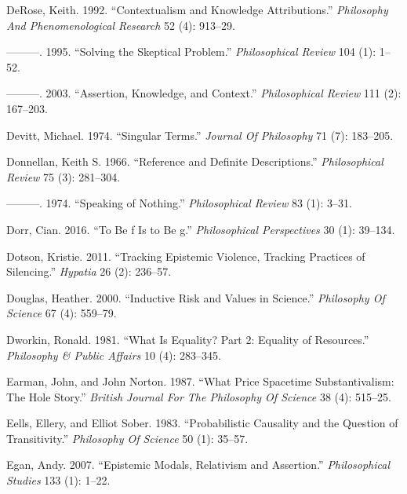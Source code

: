 \documentclass[
  10pt,
  letterpaper,
  DIV=11,
  numbers=noendperiod,
  twoside]{scrartcl}
\newlength{\cslhangindent}
\newenvironment{CSLReferences}[2] %
 {\begin{list}{}{%
  \setlength{\itemindent}{0pt}
  \setlength{\leftmargin}{0pt}
  \setlength{\parsep}{0pt}
  \ifodd #1
   \setlength{\leftmargin}{\cslhangindent}
   \setlength{\itemindent}{-1\cslhangindent}
  \fi
  \setlength{\itemsep}{#2\baselineskip}}}
 {\end{list}}
\begin{document}
\begin{CSLReferences}{1}{0}
DeRose, Keith. 1992. {``Contextualism and Knowledge Attributions.''}
\emph{Philosophy And Phenomenological Research} 52 (4): 913--29.

---------. 1995. {``Solving the Skeptical Problem.''}
\emph{Philosophical Review} 104 (1): 1--52.

---------. 2003. {``Assertion, Knowledge, and Context.''}
\emph{Philosophical Review} 111 (2): 167--203.

Devitt, Michael. 1974. {``Singular Terms.''} \emph{Journal Of
Philosophy} 71 (7): 183--205.

Donnellan, Keith S. 1966. {``Reference and Definite Descriptions.''}
\emph{Philosophical Review} 75 (3): 281--304.

---------. 1974. {``Speaking of Nothing.''} \emph{Philosophical Review}
83 (1): 3--31.

Dorr, Cian. 2016. {``To Be f Is to Be g.''} \emph{Philosophical
Perspectives} 30 (1): 39--134.

Dotson, Kristie. 2011. {``Tracking Epistemic Violence, Tracking
Practices of Silencing.''} \emph{Hypatia} 26 (2): 236--57.

Douglas, Heather. 2000. {``Inductive Risk and Values in Science.''}
\emph{Philosophy Of Science} 67 (4): 559--79.

Dworkin, Ronald. 1981. {``What Is Equality? Part 2: Equality of
Resources.''} \emph{Philosophy \& Public Affairs} 10 (4): 283--345.

Earman, John, and John Norton. 1987. {``What Price Spacetime
Substantivalism: The Hole Story.''} \emph{British Journal For The
Philosophy Of Science} 38 (4): 515--25.

Eells, Ellery, and Elliot Sober. 1983. {``Probabilistic Causality and
the Question of Transitivity.''} \emph{Philosophy Of Science} 50 (1):
35--57.

Egan, Andy. 2007. {``Epistemic Modals, Relativism and Assertion.''}
\emph{Philosophical Studies} 133 (1): 1--22.


\end{CSLReferences}
\end{document}
